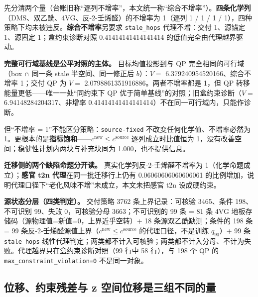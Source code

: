 \documentclass[11pt,a4paper]{article}
\newenvironment{bptable}{%
  \par\medskip\noindent\begin{minipage}{\linewidth}\centering
}{%
  \end{minipage}\par\medskip
}
\begin{document}
\begin{bptable}
\end{bptable}

先分清两个量（台账旧称``逐列不增率''，本文统一称``综合不增率''）。\textbf{四条化学列}（DMS、双乙酰、4VG、反-2-壬烯醛）的不增率为
1（逐列 1 / 1 / 1 / 1），四种策略下均未被违反。\textbf{综合不增率}另要求
\texttt{stale\_hops} 代理不增：交付 1、源锚定 1、源固定
1；盒约束诊断对照 0.41414141414141414 的低值完全由代理越界驱动。

\textbf{完整可行域基线是公平对照的主体。} 目标均值投影到与 QP
完全相同的可行域（box ∩ 同一条 stale 半空间、同一修正后 \(b\)）：\(V=\)
6.379240954520166、综合不增率 1；交付 QP 为 \(V=\)
2.0798861351916886。两者不增率都是 1，但 QP
转移能量更低------唯一一处``同约束下 QP
优于简单基线''的对照；旧盒约束诊断（\(V=\) 6.94148284204317、非增率
0.41414141414141414）不在同一可行域内，只能作诊断。

但``不增率 = 1''不能区分策略：\texttt{source-fixed}
不改变任何化学值、不增率必然为
1。更根本的是\textbf{指标饱和}------\(c^{\mathrm{new}}\le c^{\mathrm{source}}\)
逐列成立时比值恒为 1，没有改善空间；稳健性计划内两块与补充块同为
1.000，也不提供信息。

\textbf{迁移侧的两个缺陷命题分开读。} 真实化学列反-2-壬烯醛不增率为
1（化学命题成立）；\textbf{感官 t2n 代理}在同一批迁移行上仍有
0.06060606060606061
的比例增加，说明代理口径下``老化风味不增''未成立，本文未把感官 t2n
设成硬约束。

\textbf{源状态分层（四类判定）。} 交付策略 3762 条上界记录：可核验
3465、条件 198、不可识别 99、失败 0，可核验分母 3663；不可识别的 99 条 =
81 条 4VG 地板存储码（源物理值=新值=0，上界近乎空转）+ 18
条源双乙酰缺测；条件的 198 条 = 99
条反-2-壬烯醛源值上界（\(c^{\mathrm{new}}\le c^{\mathrm{source}}\)
的代理口径，不是训练 \(q_{90}\)）+ 99 条 \texttt{stale\_hops}
线性代理判定；两类都不计入可核验；两类都不计入分母、不计为失败。代理越界只在盒约束诊断对照（99
行中 58 行），与 198 个 QP 的 \texttt{max\_constraint\_violation=0}
不是同一对象。

\subsection{位移、约束残差与 z
空间位移是三组不同的量}\label{ux4f4dux79fbux7ea6ux675fux6b8bux5deeux4e0e-z-ux7a7aux95f4ux4f4dux79fbux662fux4e09ux7ec4ux4e0dux540cux7684ux91cf}
\end{document}

